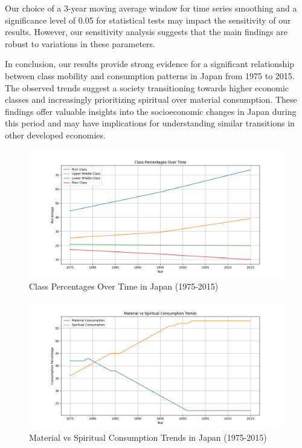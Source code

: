 \documentclass{article} %
\begin{document}
Our choice of a 3-year moving average window for time series smoothing and a significance level of 0.05 for statistical tests may impact the sensitivity of our results. However, our sensitivity analysis suggests that the main findings are robust to variations in these parameters.

In conclusion, our results provide strong evidence for a significant relationship between class mobility and consumption patterns in Japan from 1975 to 2015. The observed trends suggest a society transitioning towards higher economic classes and increasingly prioritizing spiritual over material consumption. These findings offer valuable insights into the socioeconomic changes in Japan during this period and may have implications for understanding similar transitions in other developed economies.

\begin{figure}[h]
    \centering
    \includegraphics[width=\textwidth]{class_percentages.png}
    \caption{Class Percentages Over Time in Japan (1975-2015)}
    \label{fig:class_percentages}
\end{figure}

\begin{figure}[h]
    \centering
    \includegraphics[width=\textwidth]{consumption_trends.png}
    \caption{Material vs Spiritual Consumption Trends in Japan (1975-2015)}
    \label{fig:consumption_trends}
\end{figure}
\end{document}

